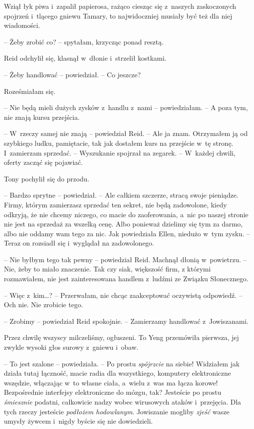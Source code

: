 \documentclass[oneside,polish,11pt,sfheadings]{mwbk}
\begin{document}
Wziął łyk piwa i~zapalił papierosa, rażąco ciesząc się z~naszych
zaskoczonych spojrzeń i~tlącego gniewu Tamary, to najwidoczniej musiały
być też dla niej wiadomości.

-- Żeby zrobić co? -- spytałam, krzycząc ponad resztą.

Reid odchylił się, klasnął w~dłonie i~strzelił kostkami. 

-- Żeby handlować -- powiedział. -- Co jeszcze?

Roześmiałam się. 

-- Nie będą mieli dużych zysków z~handlu z~nami -- powiedziałam. -- A poza tym, nie znają kursu przejścia.

-- W~rzeczy samej nie znają -- powiedział Reid. -- Ale ja znam. Otrzymałem
ją od szybkiego ludku, pamiętacie, tak jak dostałem kurs na przejście w~tę stronę. I~zamierzam sprzedać. -- Wyszukanie spojrzał na zegarek. -- W~każdej chwili, oferty zacząć się pojawiać.

Tony pochylił się do przodu. 

-- Bardzo sprytne -- powiedział. -- Ale całkiem szczerze, stracą swoje pieniądze. Firmy, którym zamierzasz
sprzedać ten sekret, nie będą zadowolone, kiedy odkryją, że nie chcemy
niczego, co macie do zaoferowania, a~nic po naszej stronie nie jest na
sprzedaż za wszelką cenę. Albo ponieważ dzielimy się tym za darmo, albo
nie oddamy wam tego za nic. Jak powiedziała Ellen, niedużo w~tym zysku.
-- Teraz on rozsiadł się i~wyglądał na zadowolonego.

-- Nie byłbym tego tak pewny -- powiedział Reid. Machnął dłonią w~powietrzu. -- Nie, żeby to miało znaczenie. Tak czy siak, większość firm,
z którymi rozmawiałem, nie jest zainteresowana handlem z~ludźmi ze
Związku Słonecznego.

-- Więc z~kim\ldots  ? -- Przerwałam, nie chcąc zaakceptować oczywistą
odpowiedź. -- Och nie. Nie zrobicie tego.

-- Zrobimy -- powiedział Reid spokojnie. -- Zamierzamy handlować z~Jowiszanami.

Przez chwilę wszyscy milczeliśmy, ogłuszeni. To Yeng przemówiła
pierwsza, jej zwykle wysoki głos surowy z~gniewu i~obaw.

-- To jest szalone -- powiedziała. -- Po prostu \textit{spójrzcie }na siebie!
Widziałem jak działa tutaj łączność, macie radia dla wszystkiego,
komputery elektroniczne wszędzie, włączając w~to własne ciała, a~wielu z~was ma łącza korowe! Bezpośrednie interfejsy elektroniczne do mózgu,
tak? Jesteście po prostu \textit{śmiesznie} podatni, całkowicie nadzy
wobec wirusowych ataków i~przejęcia. Dla tych rzeczy jesteście
\textit{podłożem hodowlanym}. Jowiszanie mogliby \textit{zjeść }wasze umysły
żywcem i~nigdy byście się nie dowiedzieli.
\end{document}
